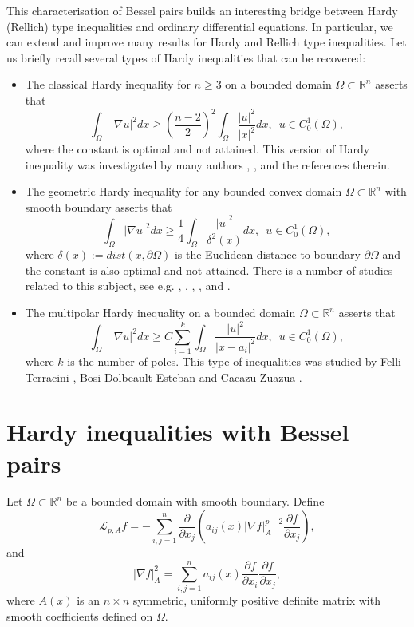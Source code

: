\documentclass[a4paper,12pt,reqno]{amsart}
\theoremstyle{theorem}
\numberwithin{equation}{section}
\theoremstyle{plain}
\theoremstyle{definition}
\theoremstyle{defi}
\begin{document}
This characterisation of Bessel pairs builds an interesting bridge between Hardy (Rellich) type inequalities and ordinary differential equations. In particular, we can extend and improve many results for Hardy and Rellich type inequalities. Let us briefly recall several types of Hardy inequalities that can be recovered:
\begin{itemize}
	\item[I.] The classical Hardy inequality for $n\geq 3$ on a bounded domain $\Omega \subset \mathbb{R}^n$ asserts that 
	\begin{equation*}
		\int_{\Omega} |\nabla u|^2 dx \geq \left(\frac{n-2}{2}\right)^2 \int_{\Omega} \frac{|u|^2}{|x|^2} dx,\,\,\, u \in C^1_0(\Omega),
	\end{equation*}
	where the constant is optimal and not attained. This version of Hardy inequality was investigated by many authors \cite{KO90}, \cite{Davies99}, \cite{RS_book} and the references therein.
	\item[II.] The geometric Hardy inequality for any bounded convex domain $\Omega \subset \mathbb{R}^n$ with smooth boundary asserts that
	\begin{equation*}
			\int_{\Omega} |\nabla u|^2 dx \geq \frac{1}{4} \int_{\Omega} \frac{|u|^2}{\delta^2(x)} dx,\,\,\, u \in C^1_0(\Omega),
	\end{equation*}
	where $\delta(x):= dist(x,\partial \Omega)$ is the Euclidean distance to boundary $\partial \Omega$ and the constant is also optimal and not attained. There is a number of studies related to this subject, see e.g. \cite{Ancona}, \cite{Avka_Lap}, \cite{Avk_Wirth}, \cite{Davies99}, \cite{KO90} and \cite{Mazya85}.
	\item[III.] The multipolar Hardy inequality on a bounded domain $\Omega \subset \mathbb{R}^n$ asserts that 
	\begin{equation*}
		\int_{\Omega} |\nabla u|^2 dx \geq C \sum_{i=1}^k\int_{\Omega} \frac{|u|^2}{|x-a_i|^2} dx,\,\,\, u \in C^1_0(\Omega),
	\end{equation*}
	where $k$ is the number of poles. This type of inequalities was studied by Felli-Terracini \cite{FT06}, Bosi-Dolbeault-Esteban \cite{BDE08} and Cacazu-Zuazua \cite{CZ13}.
\end{itemize} 


\section{Hardy inequalities with Bessel pairs}\label{sec_Hardy}
Let $\Omega \subset \mathbb{R}^n$ be a bounded domain with smooth boundary. Define 
\begin{equation}\label{eq-L_Ap}
\mathcal{L}_{p,A} f = - \sum_{i,j=1}^n \frac{\partial}{\partial {x_j}} \left( a_{ij}(x)|\nabla f|^{p-2}_A \frac{\partial f}{\partial x_j}  \right),
\end{equation}
and 
\begin{equation*}
|\nabla f|^2_A = \sum_{i,j=1}^n a_{ij}(x) \frac{\partial f}{\partial x_i} \frac{\partial f}{\partial x_j},
\end{equation*}
where $A(x)$ is an $n\times n$ symmetric, uniformly positive definite matrix with smooth coefficients defined on $\Omega$. 
\end{document}

